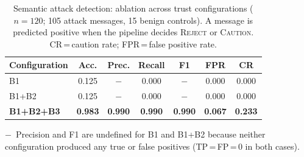 \begin{table}[t]
\centering
\caption{Semantic attack detection: ablation across trust configurations
         ($n = 120$; 105 attack messages, 15 benign controls).
         A message is predicted positive when the pipeline decides
         \textsc{Reject} or \textsc{Caution}.
         CR\,=\,caution rate; FPR\,=\,false positive rate.}
\label{tab:semantic_ablation}
\renewcommand{\arraystretch}{1.15}
\begin{tabular}{lcccccc}
\toprule
\textbf{Configuration} & \textbf{Acc.} & \textbf{Prec.} & \textbf{Recall} & \textbf{F1} & \textbf{FPR} & \textbf{CR} \\
\midrule
B1                 & 0.125 & $-$ & 0.000 & $-$ & 0.000 & 0.000 \\
B1+B2              & 0.125 & $-$ & 0.000 & $-$ & 0.000 & 0.000 \\
\textbf{B1+B2+B3} & \textbf{0.983} & \textbf{0.990} & \textbf{0.990} & \textbf{0.990} & \textbf{0.067} & \textbf{0.233} \\
\bottomrule
\end{tabular}
\begin{minipage}{\columnwidth}
\vspace{2pt}
{\footnotesize
$-$~Precision and F1 are undefined for B1 and B1+B2 because neither
configuration produced any true or false positives
(TP\,=\,FP\,=\,0 in both cases).}
\end{minipage}
\end{table}